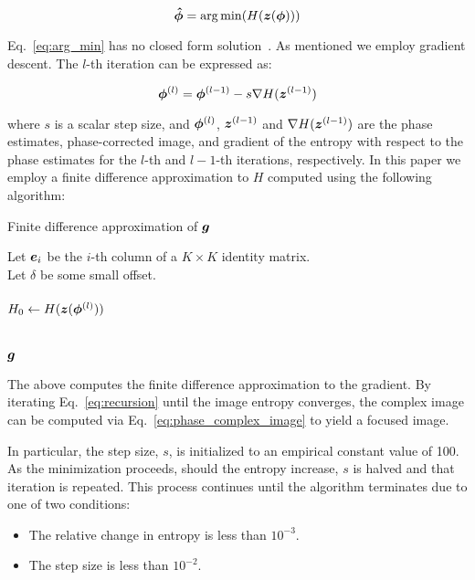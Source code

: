 \begin{equation}\label{eq:arg_min}
  \bm{\hat{\phi}} = \operatorname*{arg\,min}(H(\bm{z}(\bm{\phi})))
\end{equation}

Eq.~\ref{eq:arg_min} has no closed form solution~\cite{ash2012autofocus}. As
mentioned we employ gradient descent. The $l$-th iteration can be expressed as:

\begin{equation}\label{eq:recursion}
  \bm{\phi}^{(l)} = \bm{\phi}^{(l-1)} - s \nabla H(\bm{z}^{(l-1)})
\end{equation}

where $s$ is a scalar step size, and $\bm{\phi}^{(l)}$, $\bm{z}^{(l-1)}$ and $\nabla
H(\bm{z}^{(l-1)})$ are the phase estimates, phase-corrected image, and gradient of
the entropy with respect to the phase estimates for the $l$-th and $l-1$-th
iterations, respectively.  In this paper we employ a finite difference
approximation to $H$ computed using the following algorithm:


\begin{algorithm}
  \caption{Finite difference approximation of $\bm{g}$}
  \label{alg:finitediff}
  Let $\bm{e}_i$ be the $i$-th column of a $K \times K$ identity matrix.\\
  Let $\delta$ be some small offset.\\
  \ \\
  $H_0 \gets H(\bm{z}(\bm{\phi}^{(l)}))$\\
  \ \\
  \ \\
  \Return $\bm{g}$
  \vspace{5 mm}
\end{algorithm}

The above computes the finite difference approximation to the gradient. By
iterating Eq.~\ref{eq:recursion} until the image entropy converges, the
complex image can be computed via Eq.~\ref{eq:phase_complex_image} to yield a
focused image.

In particular, the step size, $s$, is initialized to an empirical constant value
of 100. As the minimization proceeds, should the entropy increase, $s$ is halved
and that iteration is repeated. This process continues until the algorithm
terminates due to one of two conditions:

\begin{itemize}
  \item The relative change in entropy is less than $10^{-3}$.
  \item The step size is less than $10^{-2}$.
\end{itemize}


